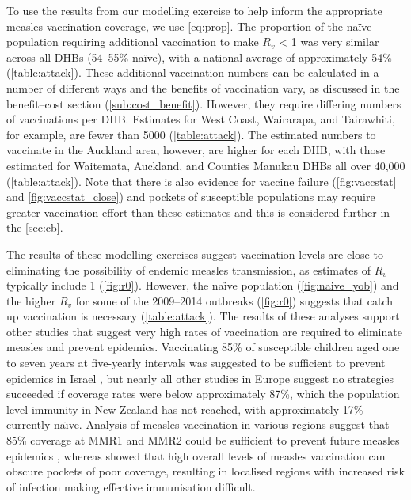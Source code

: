 \documentclass{article}
\begin{document}
To use the results from our modelling exercise to help inform the appropriate measles vaccination coverage, we use \autoref{eq:prop}. The proportion of the na\"{i}ve population requiring additional vaccination to make $R_v$ < 1 was very similar across all DHBs (54--55\% na\"{i}ve), with a national average of approximately 54\% (\autoref{table:attack}). These additional vaccination numbers can be calculated in a number of different ways and the benefits of vaccination vary, as discussed in the benefit--cost section (\autoref{sub:cost_benefit}). However, they require differing numbers of vaccinations per DHB. Estimates for West Coast, Wairarapa, and Tairawhiti, for example, are fewer than 5000 (\autoref{table:attack}). The estimated numbers to vaccinate in the Auckland area, however, are higher for each DHB, with those estimated for Waitemata, Auckland, and Counties Manukau DHBs all over 40,000  (\autoref{table:attack}). Note that there is also evidence for vaccine failure (\autoref{fig:vaccstat} and \autoref{fig:vaccstat_close}) and pockets of susceptible populations \citep{glass4} may require greater vaccination effort than these estimates and this is considered further in the \autoref{sec:cb}.

The results of these modelling exercises suggest vaccination levels are close to eliminating the possibility of endemic measles transmission, as estimates of $R_v$ typically include 1 (\autoref{fig:r0}). However, the na\"{\i}ve population (\autoref{fig:naive_yob}) and the higher $R_v$ for some of the 2009--2014 outbreaks (\autoref{fig:r0}) suggests that catch up vaccination is necessary (\autoref{table:attack}). The results of these analyses support other studies that suggest very high rates of vaccination are required to eliminate measles and prevent epidemics. Vaccinating 85\% of susceptible children aged one to seven years at five-yearly intervals was suggested to be sufficient to prevent epidemics in Israel \citep{agur93}, but nearly all other studies in Europe suggest no strategies succeeded if coverage rates were below approximately 87\%, which the population level immunity in New Zealand has not reached, with approximately 17\% currently na\"{\i}ve. Analysis of measles vaccination in various regions suggest that 85\% coverage at MMR1 and MMR2 could be sufficient to prevent future measles epidemics \citep{agur93, babad95, edmunds0, gay98, wallinga1}, whereas \citep{glass4} showed that high overall levels of measles vaccination can obscure pockets of poor coverage, resulting in localised regions with increased risk of infection making effective immunisation difficult.
\end{document}
